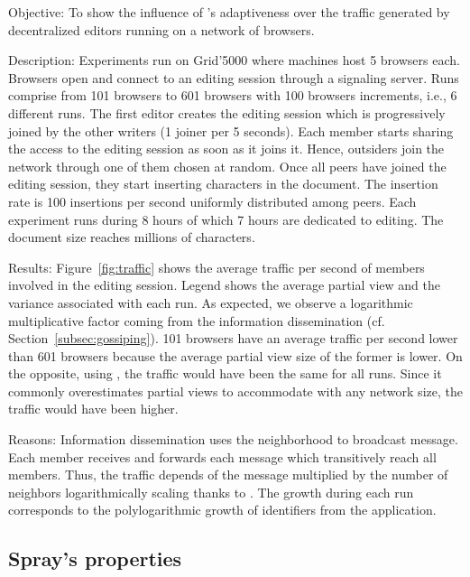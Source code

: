 \begin{asparadesc}
\item [Objective:] To show the influence of \SPRAY's adaptiveness over the
  traffic generated by decentralized editors running on a network of browsers.
\item [Description:] Experiments run on Grid'5000 where machines host 5 browsers
  each. Browsers open \CRATE and connect to an editing session through a
  signaling server.  Runs comprise from 101 browsers to 601 browsers with 100
  browsers increments, i.e., 6 different runs.  The first editor creates the
  editing session which is progressively joined by the other writers (1 joiner
  per 5 seconds). Each member starts sharing the access to the editing session
  as soon as it joins it. Hence, outsiders join the network through one of them
  chosen at random. Once all peers have joined the editing session, they start
  inserting characters in the document. The insertion rate is 100 insertions per
  second uniformly distributed among peers. Each experiment runs during 8 hours
  of which 7 hours are dedicated to editing. The document size reaches millions
  of characters.
\item [Results:] Figure~\ref{fig:traffic} shows the average traffic per second
  of members involved in the editing session. Legend shows the average partial
  view and the variance associated with each run. As expected, we observe a
  logarithmic multiplicative factor coming from the information dissemination
  (cf. Section~\ref{subsec:gossiping}). 101 browsers have an average traffic per
  second lower than 601 browsers because the average partial view size of the
  former is lower.  On the opposite, using \CYCLON, the traffic would have been
  the same for all runs. Since it commonly overestimates partial views to
  accommodate with any network size, the traffic would have been higher.
\item [Reasons:] Information dissemination uses the neighborhood to broadcast
  message. Each member receives and forwards each message which transitively
  reach all members. Thus, the traffic depends of the message multiplied by the
  number of neighbors logarithmically scaling thanks to \SPRAY. The growth
  during each run corresponds to the polylogarithmic growth of identifiers from
  the application.
\end{asparadesc}


\subsection{Spray's properties}

